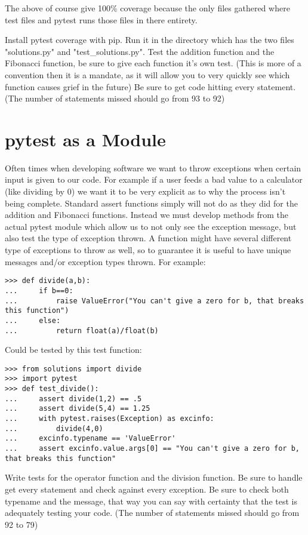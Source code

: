 \documentclass[nociteref]{../../SIAM-GH-book}
\begin{document}
The above of course give 100\% coverage because the only files gathered where test files and pytest runs those files in there entirety.

\begin{problem}
Install pytest coverage with pip.
Run it in the directory which has the two files "solutions.py" and "test\_solutions.py".
Test the addition function and the Fibonacci function, be sure to give each function it's own test. (This is more of a convention then it is a mandate,
as it will allow you to very quickly see which function causes grief in the future) Be sure to get code hitting every statement.
(The number of statements missed should go from 93 to 92)
\end{problem}

\section*{pytest as a Module}

Often times when developing software we want to throw exceptions when certain input is given to our code.
For example if a user feeds a bad value to a calculator (like dividing by 0) we want it to be very explicit as to why the process isn't being complete.
Standard assert functions simply will not do as they did for the addition and Fibonacci functions.
Instead we must develop methods from the actual pytest module which allow us to not only see the exception message, but also test the type of exception thrown.
A function might have several different type of exceptions to throw as well, so to guarantee it is useful to have unique messages and/or exception types thrown.
For example:

\begin{lstlisting}
>>> def divide(a,b):
...     if b==0:
...         raise ValueError("You can't give a zero for b, that breaks this function")
...     else:
...         return float(a)/float(b)
\end{lstlisting}
Could be tested by this test function:
\begin{lstlisting}
>>> from solutions import divide
>>> import pytest
>>> def test_divide():
...     assert divide(1,2) == .5
...     assert divide(5,4) == 1.25
...     with pytest.raises(Exception) as excinfo:
...         divide(4,0)
...     excinfo.typename == 'ValueError'
...     assert excinfo.value.args[0] == "You can't give a zero for b, that breaks this function"
\end{lstlisting}

\begin{problem}
Write tests for the operator function and the division function. Be sure to handle get every statement and check against every exception.
Be sure to check both typename and the message, that way you can say with certainty that the test is adequately testing your code.
(The number of statements missed should go from 92 to 79)
\end{problem}
\end{document}

